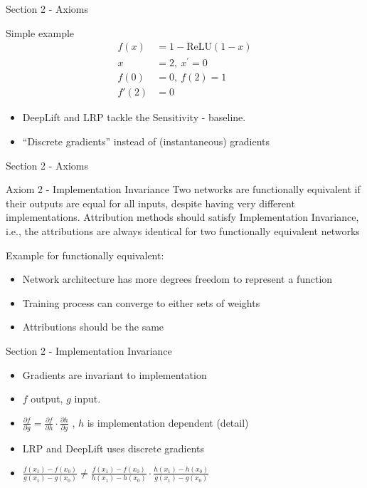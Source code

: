 \documentclass[serif]{beamer}
\begin{document}
\begin{frame}{Section 2 - Axioms}
	\begin{block}{Simple example}
		\begin{align*}
			f(x) &= 1-\text{ReLU}(1-x) \\
			x&=2,~x^\prime=0\\
			f(0) &= 0, ~f(2) = 1\\
			 f'(2) &= 0
		\end{align*}
	\end{block}
	\begin{itemize} 
	\item DeepLift and LRP tackle the Sensitivity - baseline.
	\item “Discrete gradients” instead of (instantaneous) gradients
	\end{itemize} 
\end{frame}

\begin{frame}{Section 2 - Axioms}	
	\begin{block}{Axiom 2 - Implementation Invariance}
		Two networks are functionally equivalent if their outputs
		are equal for all inputs, despite having very different implementations.
		Attribution methods should satisfy Implementation
		Invariance, i.e., the attributions are always identical
		for two functionally equivalent networks
	\end{block}	
	Example for functionally equivalent:
	\begin{itemize}
		\item Network architecture has more degrees freedom to represent a function
		\item Training process can converge to either sets of weights
		\item Attributions should be the same
	\end{itemize}
\end{frame}

\begin{frame}{Section 2 - Implementation Invariance}	
	\begin{itemize}
		\item Gradients are invariant to implementation
		\item $f$ output, $g$ input.
		\item $\frac{\partial f}{\partial g} = \frac{\partial f}{\partial h} \cdot \frac{\partial h}{\partial g}$ , $h$ is implementation dependent (detail)
		\item LRP and DeepLift uses discrete gradients
		\item $\frac{f(x_1)-f(x_0)}{g(x_1)-g(x_0)} \ne \frac{f(x_1)-f(x_0)}{h(x_1)-h(x_0)} \cdot \frac{h(x_1)-h(x_0)}{g(x_1)-g(x_0)}$
	\end{itemize}
\end{frame}
\end{document}
